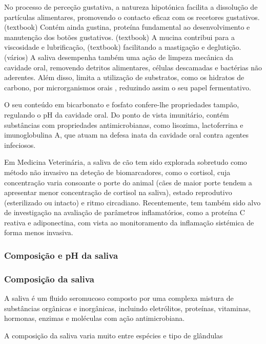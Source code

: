 No processo de perceção gustativa, a natureza hipotónica facilita a dissolução de partículas alimentares, promovendo o contacto eficaz com os recetores gustativos. (textbook) Contém ainda gustina, proteína fundamental ao desenvolvimento e manutenção dos botões gustativos. (textbook) A mucina contribui para a viscosidade e lubrificação, (textbook) facilitando a mastigação e deglutição. (vários) 
A saliva desempenha também uma ação de limpeza mecânica da cavidade oral, removendo detritos alimentares, células descamadas e bactérias não aderentes. Além disso, limita a utilização de substratos, como os hidratos de carbono, por microrganismos orais , reduzindo assim o seu papel fermentativo.


O seu conteúdo em bicarbonato e fosfato confere-lhe propriedades tampão, regulando o pH da cavidade oral.
Do ponto de vista imunitário, contém substâncias com propriedades antimicrobianas, como lisozima, lactoferrina e imunoglobulina A, que atuam na defesa inata da cavidade oral contra agentes infeciosos. \cite{Mescher2018}


Em Medicina Veterinária, a saliva de cão tem sido explorada sobretudo como método não invasivo na deteção de biomarcadores, como o cortisol, cuja concentração varia consoante o porte do animal (cães de maior porte tendem a apresentar menor concentração de cortisol na saliva), estado reprodutivo (esterilizado ou intacto) e ritmo circadiano.\cite{serial,Pasha2018} Recentemente, tem também sido alvo de investigação na avaliação de parâmetros inflamatórios, como a proteína C reativa e adiponectina, com vista ao monitoramento da inflamação sistémica de forma menos invasiva.\cite{Pasha2018} 

\subsubsection{Composição e pH da saliva}

\subsubsection{Composição da saliva}

A saliva é um fluido seromucoso composto por uma complexa mistura de substâncias orgânicas e inorgânicas, incluindo eletrólitos, proteínas, vitaminas, hormonas, enzimas e moléculas com ação antimicrobiana. \cite{lemmons2018}

A composição da saliva varia muito entre espécies e tipo de glândulas \cite{Das_Textbook}

